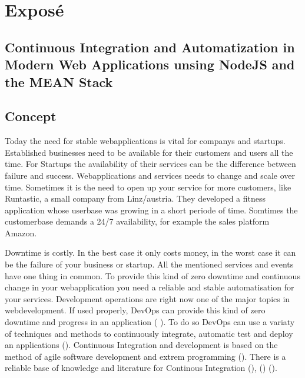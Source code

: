 \section{Exposé}

\subsection{Continuous Integration and Automatization in Modern Web Applications unsing NodeJS and the MEAN Stack}


\subsection{Concept}
Today the need for stable webapplications is vital for companys and startups. Established businesses need to be
available for their customers and users all the time. For Startups the availability of their services can be the difference
between failure and success. Webapplications and services needs to change and scale over time. Sometimes it is the need
to open up your service for more customers, like Runtastic, a small company from Linz/austria. They developed
a fitness application whose userbase was growing in a short periode of time. Somtimes the customerbase demands a 24/7
availability, for example the sales platform Amazon.

Downtime is costly. In the best case it only costs money, in the worst case
it can be the failure of your business or startup. All the mentioned services and events have one thing in common. To provide this kind of zero downtime and continuous change in
your webapplication you need a reliable and stable automatisation for your services. Development operations are right now one of
the major topics in webdevelopment. If used properly, DevOps can provide this kind of zero downtime and progress in an application
(\cite{humble2010continuous} \cite{duvall2007continuous}). To do so DevOps can use a variaty of techniques and methods to continuously
integrate, automatic test and deploy an applications (\cite{meyer2014continuous}).
Continuous Integration and development is based on the method of agile software development and extrem programming
(\cite{lindstrom2004extreme}). There is a reliable base of knowledge and literature for Continous Integration
(\cite{schaefer2013continuous}), (\cite{fowler2006continuous}) (\cite{fowler2012continuous}).

